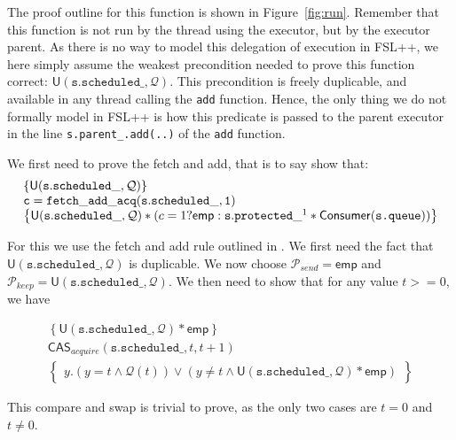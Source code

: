 The proof outline for this function is shown in Figure~\ref{fig:run}. Remember that this function is not run by the thread using the executor, but by the executor parent. As there is no way to model this delegation of execution in FSL++, we here simply assume the weakest precondition needed to prove this function correct: $\mathsf{U}(\mathtt{s.scheduled\_}, \mathcal{Q})$. This precondition is freely duplicable, and available in any thread calling the \texttt{add} function. Hence, the only thing we do not formally model in FSL++ is how this predicate is passed to the parent executor in the line \texttt{s.parent\_.add(..)} of the \texttt{add} function. 

We first need to prove the fetch and add, that is to say show that:
\begin{equation*}
		\begin{array}{l}
	\left\{\mathsf{U}(\mathtt{s.scheduled\_}, \mathcal{Q}) \right\} \\
		\mathtt{c = fetch\_add\_acq(s.scheduled\_, 1)} \\
		\left\{\mathsf{U}(\mathtt{s.scheduled\_}, \mathcal{Q}) * (c = 1 ? \mathsf{emp} :  \mathtt{s.protected\_}^1 * \mathsf{Consumer}(\texttt{s.queue})) \right\}
\end{array}
\end{equation*}

For this we use the fetch and add rule outlined in \cite{fsl}. We first need the fact that $\mathsf{U}(\mathtt{s.scheduled\_}, \mathcal{Q})$ is duplicable. We now choose $\mathcal{P}_{send} = \mathsf{emp}$ and $\mathcal{P}_{keep} = \mathsf{U}(\mathtt{s.scheduled\_}, \mathcal{Q})$. We then need to show that for any value $t >= 0$, we have

\begin{equation*}
		\begin{array}{l}
		\left\{ \mathsf{U}(\mathtt{s.scheduled\_}, \mathcal{Q}) * \mathsf{emp}
		\right\}\\
				\mathsf{CAS}_{acquire}(\mathtt{s.scheduled\_}, t, t + 1) \\
		\left\{
				\begin{array}{l}
						y. (y = t \land \mathcal{Q}(t)) \lor (y \neq t \land \mathsf{U}(\mathtt{s.scheduled\_}, \mathcal{Q}) * \mathsf{emp})
				\end{array}
		\right\}
		\end{array}
\end{equation*}

This compare and swap is trivial to prove, as the only two cases are $t = 0$ and $t \neq 0$.

